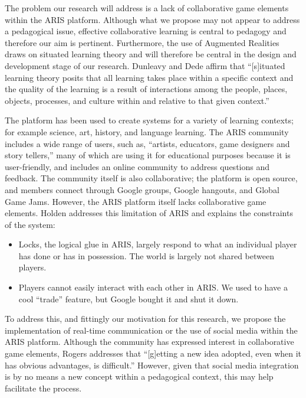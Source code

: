 \documentclass{sigchi}
\begin{document}
The problem our research will address is a lack of collaborative game elements within the ARIS platform.  Although what we propose may not appear to address a pedagogical issue, effective collaborative learning is central to pedagogy and therefore our aim is pertinent.\cite{inaba2004learners} Furthermore, the use of Augmented Realities draws on situated learning theory and will therefore be central in the design and development stage of our research. Dunleavy and Dede affirm that ``[s]ituated learning theory posits that all learning takes place within a specific context and the quality of the learning is a result of interactions among the people, places, objects, processes, and culture within and relative to that given context.''\cite{dunleavy2014augmented}

The platform has been used to create systems for a variety of learning contexts; for example science, art, history, and language learning.\cite{gagnon2010aris, holden2012leveraging, roy2013examining, dunleavy2014augmented} The ARIS community includes a wide range of users, such as, ``artists, educators, game designers and story tellers,''\cite{aris2015} many of which are using it for educational purposes because it is user-friendly, and includes an online community to address questions and feedback.\cite{roy2013examining} The community itself is also collaborative; the platform is open source, and members connect through Google groups, Google hangouts, and Global Game Jams. However, the ARIS platform itself lacks collaborative game elements. Holden addresses this limitation of ARIS and explains the constraints of the system:

\begin{itemize}
  \item Locks, the logical glue in ARIS, largely respond to what an individual player has done or has in possession. The world is largely not shared between players.
  \item Players cannot easily interact with each other in ARIS. We used to have a cool ``trade'' feature, but Google bought it and shut it down.\cite{algorar2015}
\end{itemize}

To address this, and fittingly our motivation for this research, we propose the implementation of real-time communication or the use of social media within the ARIS platform. Although the community has expressed interest in collaborative game elements, Rogers addresses that ``[g]etting a new idea adopted, even when it has obvious advantages, is difficult.''\cite{rogers2003diffusion} However, given that social media integration is by no means a new concept within a pedagogical context, this may help facilitate the process.
\end{document}
